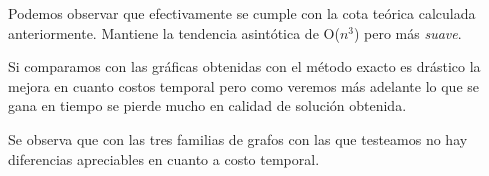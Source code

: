 \quad

\quad Podemos observar que efectivamente se cumple con la cota teórica calculada anteriormente. Mantiene la tendencia asintótica de O($ n^{3}$) pero más \textit{suave}. 

\quad Si comparamos con las gráficas obtenidas con el método exacto es drástico la mejora en cuanto costos temporal pero como veremos más adelante lo que se gana en tiempo se pierde mucho en calidad de solución obtenida.

\quad Se observa que con las tres familias de grafos con las que testeamos no hay diferencias apreciables en cuanto a costo temporal.